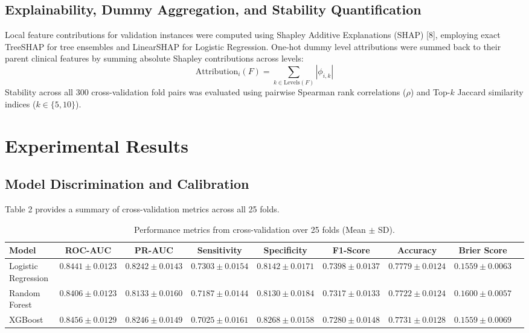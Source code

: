 \documentclass[runningheads]{llncs}
\begin{document}
\subsection{Explainability, Dummy Aggregation, and Stability Quantification}
Local feature contributions for validation instances were computed using Shapley Additive Explanations (SHAP) [8], employing exact TreeSHAP for tree ensembles and LinearSHAP for Logistic Regression. One-hot dummy level attributions were summed back to their parent clinical features by summing absolute Shapley contributions across levels:
\begin{equation}
\text{Attribution}_i(F) = \sum_{k \in \text{Levels}(F)} |\phi_{i, k}|
\end{equation}
Stability across all 300 cross-validation fold pairs was evaluated using pairwise Spearman rank correlations ($\rho$) and Top-$k$ Jaccard similarity indices ($k \in \{5, 10\}$).

\section{Experimental Results}
\subsection{Model Discrimination and Calibration}
Table 2 provides a summary of cross-validation metrics across all 25 folds.

\begin{table}[t]
\caption{Performance metrics from cross-validation over 25 folds (Mean $\pm$ SD).}\label{tab:metrics}
\centering
\small
\begin{tabular}{lcccccccc}
\toprule
Model & ROC-AUC & PR-AUC & Sensitivity & Specificity & F1-Score & Accuracy & Brier Score \\
\midrule
Logistic Regression & $0.8441 \pm 0.0123$ & $0.8242 \pm 0.0143$ & $0.7303 \pm 0.0154$ & $0.8142 \pm 0.0171$ & $0.7398 \pm 0.0137$ & $0.7779 \pm 0.0124$ & $0.1559 \pm 0.0063$ \\
Random Forest & $0.8406 \pm 0.0123$ & $0.8133 \pm 0.0160$ & $0.7187 \pm 0.0144$ & $0.8130 \pm 0.0184$ & $0.7317 \pm 0.0133$ & $0.7722 \pm 0.0124$ & $0.1600 \pm 0.0057$ \\
XGBoost & $0.8456 \pm 0.0129$ & $0.8246 \pm 0.0149$ & $0.7025 \pm 0.0161$ & $0.8268 \pm 0.0158$ & $0.7280 \pm 0.0148$ & $0.7731 \pm 0.0128$ & $0.1559 \pm 0.0069$ \\
\bottomrule
\end{tabular}
\end{table}
\end{document}
